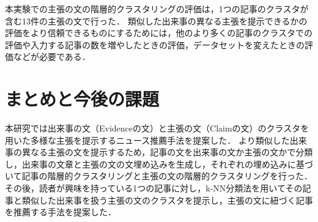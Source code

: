 \documentclass[12pt,a4j]{jreport}
\begin{document}
本実験での主張の文の階層的クラスタリングの評価は，1つの記事のクラスタが含む13件の主張の文で行った．
類似した出来事の異なる主張を提示できるかの評価をより信頼できるものにするためには，他のより多くの記事のクラスタでの評価や入力する記事の数を増やしたときの評価，データセットを変えたときの評価などが必要である．










\chapter{まとめと今後の課題}
\label{chapter_conclusion}

本研究では出来事の文（Evidenceの文）と主張の文（Claimの文）のクラスタを用いた多様な主張を提示するニュース推薦手法を提案した．
より類似した出来事の異なる主張の文を提示するため，記事の文を出来事の文か主張の文かで分類し，出来事の文章と主張の文の文埋め込みを生成し，それぞれの埋め込みに基づいて記事の階層的クラスタリングと主張の文の階層的クラスタリングを行った．
その後，読者が興味を持っている1つの記事に対し，k-NN分類法を用いてその記事と類似した出来事を扱う主張の文のクラスタを提示し，主張の文に紐づく記事を推薦する手法を提案した．
\end{document}
